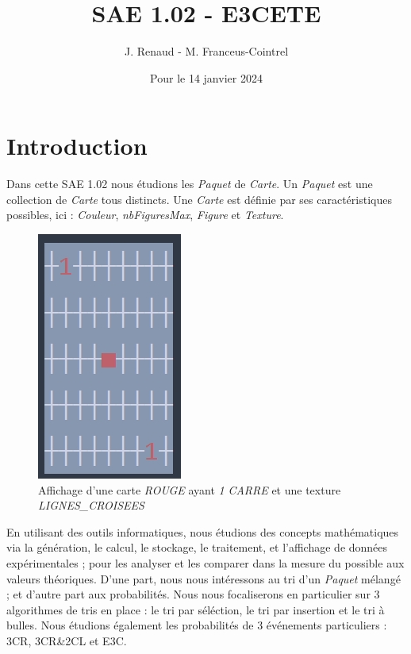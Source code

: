 \documentclass{report}
\title{\textbf{SAE 1.02 - E3CETE}}
\author{J. Renaud - M. Franceus-Cointrel}
\date{Pour le 14 janvier 2024}
\begin{document}
\maketitle
\tableofcontents

\chapter*{Introduction}

\qquad Dans cette SAE 1.02 nous étudions les \textit{Paquet} de \textit{Carte}. Un \textit{Paquet} est une collection de \textit{Carte} tous distincts. Une \textit{Carte} est définie par ses caractéristiques possibles, ici : \textit{Couleur}, \textit{nbFiguresMax}, \textit{Figure} et \textit{Texture}. 

\begin{figure}[H]
\centering
\includegraphics[scale=1]{../graphe/carte.png}
\caption{Affichage d'une carte \textit{ROUGE} ayant \textit{1} \textit{CARRE} et une texture \textit{LIGNES\_CROISEES}}
\end{figure}


\noindent En utilisant des outils informatiques, nous étudions des concepts mathématiques via la génération, le calcul, le stockage, le traitement, et l'affichage de données expérimentales ; pour les analyser et les comparer dans la mesure du possible aux valeurs théoriques. D'une part, nous nous intéressons au tri d'un \textit{Paquet} mélangé ; et d'autre part aux probabilités. Nous nous focaliserons en particulier sur 3 algorithmes de tris en place : le tri par séléction, le tri par insertion et le tri à bulles. Nous étudions également les probabilités de 3 événements particuliers : 3CR, 3CR\&2CL et E3C. 
\end{document}
